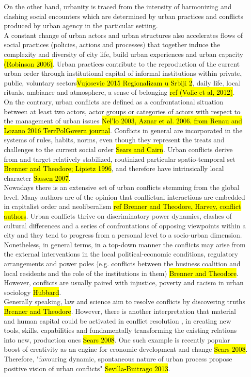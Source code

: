 \documentclass[11pt]{report}
\begin{document}
On the other hand, urbanity is traced from the intensity of harmonizing and clashing social encounters which are determined by urban practices and conflicts produced by urban agency in the particular setting. 
\\
A constant change of urban actors and urban structures also accelerates flows of social practices (policies, actions and processes) that together induce the complexity and diversity of city life, build urban experiences and urban capacity \hl{(Robinson 2006)}.
Urban practices contribute to the reproduction of the current urban order through institutional capital of informal institutions within private, public, voluntary sectors\hl{Vujosevic 2015 Regionalizam u Srbiji 2}, daily life, local rituals, ambiance and atmosphere, a sense of belonging \hl{ref (Volic et al, 2012)}.
\\
On the contrary, urban conflicts are defined as a confrontational situation between at least two actors, actor groups or categories of actors with respect to the management of urban issues \hl{Nel'lo 2003, Aznar et al. 2006. from Renau and Lozano 2016 TerrPolGovern journal}.
Conflicts in general are incorporated in the systems of rules, habits, norms, even though they represent the treats and challenges to the current social order \hl{Sears and Cairn}.
Urban conflicts derive from and target relatively stabilized, routinized particular spatio-temporal set \hl{Brenner and Theodore; Lipietz 1996}, and therefore have intrinsically local character \hl{Sassen 2007}.
\\
Nowadays there is an extensive set of urban conflicts stemming from the global level.
Many authors are of the opinion that conflictual interactions are embedded in capitalist order and neoliberalism \hl{ref Brenner and Theodore, Harvey, conflict authors}.
Urban conflicts thrive on discriminatory power dynamics, clashes of cultural differences and a series of confrontations of opposing viewpoints within a city and they tend to progress from a personal level to a socio-urban dimension.
\\
Nonetheless, in general terms, in a top-down manner the conflicts may arise from the external interventions in the local political-economic conditions, regulatory arrangements and power poles (e.g. conflicts between the business coalition and local residents and the role of the institutions in them) \hl{Brenner and Theodore}.
However, conflicts are usually paired with injustice, poverty and racism in urban sociology \hl{Hubbard}.
\\
Generally speaking, law and science aim to resolve conflicts by discovering truths \hl{Brenner and Theodore}.
However, there is another interpretation that material and human capital could be activated in conflict resolution \cite{Coleman 1988}, in creating new tools, skills, capabilities and fundamentally transforming the existing relations into new, production ones \hl{Sears 2008}. One such example is recently popular boost of creativity as an engine for economic development and change \hl{Sears 2008}.
Therefore, "favouring dynamic, spontaneous nature of urban process propose positive vision of urban conflicts" 
\hl{Sevilla-Buitrago 2013}.
\end{document}
